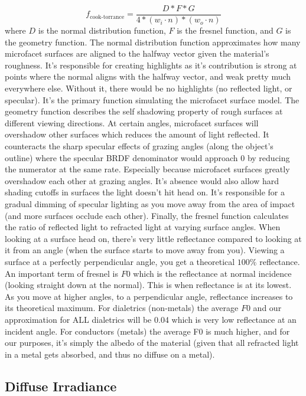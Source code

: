 \documentclass{article}
\begin{document}
\[f_{\text{cook-torrance}} = \frac{D*F*G}{4*(w_i \cdot n)*(w_o \cdot n)}\]
where \(D\) is the normal distribution function, \(F\) is the fresnel function, and \(G\) is the geometry function.
The normal distribution function approximates how many microfacet surfaces are aligned to the halfway vector given the
material's roughness. It's responsible for creating highlights as it's contribution is strong at points where the normal aligns with the halfway vector, and weak pretty much
everywhere else. Without it, there would be no highlights (no reflected light, or specular). It's the primary function simulating the microfacet surface model. 
The geometry function describes the self shadowing property of rough surfaces at different viewing directions. At certain angles, microfacet surfaces will overshadow other surfaces which reduces the amount of light reflected.
It counteracts the sharp specular effects of grazing angles (along the object's outline) where the specular BRDF denominator would approach 0 by reducing the numerator at the same rate. Especially because microfacet surfaces 
greatly overshadow each other at grazing angles. It's absence would also allow hard shading cutoffs in surfaces the light doesn't hit head on. It's responsible for a gradual dimming of specular lighting as you move away from the area of impact (and more surfaces occlude each other).
Finally, the fresnel function calculates the ratio of reflected light to refracted light at varying surface angles. When looking at a surface head on, there's very little reflectance compared to looking at it from an angle (when the surface starts to move away from you).
Viewing a surface at a perfectly perpendicular angle, you get a theoretical \(100\%\) reflectance. An important term of fresnel is \(F0\) which is the reflectance at normal incidence (looking straight down at the normal). This is when reflectance is at its lowest. As you move at higher angles,
to a perpendicular angle, reflectance increases to its theoretical maximum. For dialetrics (non-metals) the average \(F0\) and our approximation for ALL dialetrics will be 0.04 which is very low reflectance at an incident angle. For conductors (metals)
the average F0 is much higher, and for our purposes, it's simply the albedo of the material (given that all refracted light in a metal gets absorbed, and thus no diffuse on a metal).

\subsection{Diffuse Irradiance}
\end{document}
